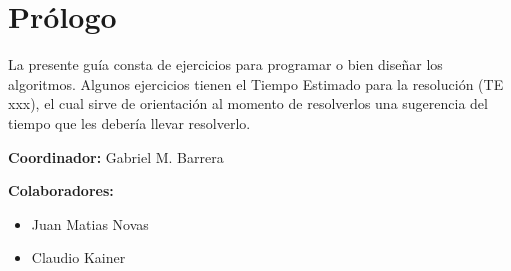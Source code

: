 \chapter{Prólogo}
La presente guía consta de ejercicios para programar o bien diseñar los algoritmos.
Algunos ejercicios tienen el Tiempo Estimado para la resolución (TE xxx), el cual sirve de orientación al momento de resolverlos una sugerencia del tiempo que les debería llevar resolverlo.

\textbf{Coordinador:} Gabriel M. Barrera

\textbf{Colaboradores:} 
\begin{itemize}
	\item Juan Matias Novas
	\item Claudio Kainer	
\end{itemize}

 